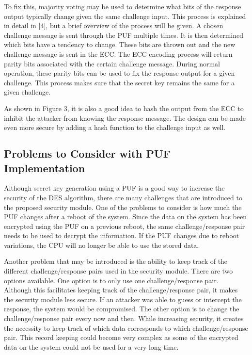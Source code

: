 \documentclass[letterpaper, 10pt, conference]{ieeeconf}  %
\begin{document}
To fix this, majority voting may be used to determine what bits of the response output typically change given the same challenge input.  This process is explained in detail in [4], but a brief overview of the process will be given.  A chosen challenge message is sent through the PUF multiple times.  It is then determined which bits have a tendency to change.  These bits are thrown out and the new challenge message is sent in the ECC.  The ECC encoding process will return parity bits associated with the certain challenge message.  During normal operation, these parity bits can be used to fix the response output for a given challenge.  This process makes sure that the secret key remains the same for a given challenge.

As shown in Figure 3, it is also a good idea to hash the output from the ECC to inhibit the attacker from knowing the response message.  The design can be made even more secure by adding a hash function to the challenge input as well.  

\subsection{Problems to Consider with PUF Implementation}

Although secret key generation using a PUF is a good way to increase the security of the DES algorithm, there are many challenges that are introduced to the proposed security module.  One of the problems to consider is how much the PUF changes after a reboot of the system.  Since the data on the system has been encrypted using the PUF on a previous reboot, the same challenge/response pair needs to be used to decrypt the information.  If the PUF changes due to reboot variations, the CPU will no longer be able to use the stored data.

Another problem that may be introduced is the ability to keep track of the different challenge/response pairs used in the security module.  There are two options available.  One option is to only use one challenge/response pair.  Although this facilitates keeping track of the challenge/response pair, it makes the security module less secure.  If an attacker was able to guess or intercept the response, the system would be compromised.  The other option is to change the challenge/response pair every now and then.  While increasing security, it creates the necessity to keep track of which data corresponds to which challenge/response pair.  This record keeping could become very complex as some of the encrypted data on the system could not be used for a very long time.
\end{document}
